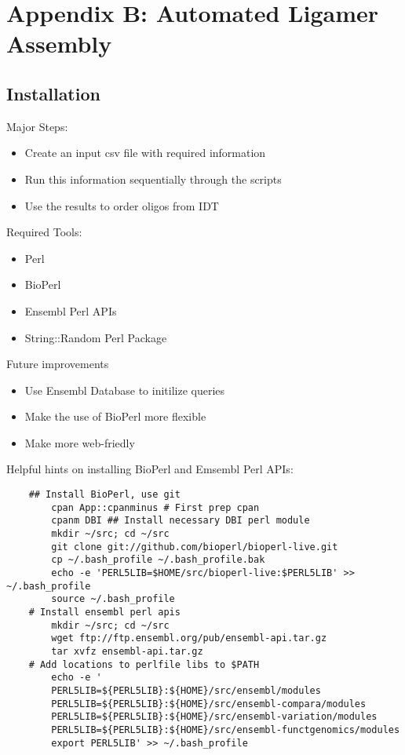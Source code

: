 \chapter{Appendix B: Automated Ligamer Assembly}\label{Appendix:AutoMatedLigamerAssembly} 

\section{Installation}

Major Steps:
\begin{itemize}
	\item  Create an input csv file with required information
	\item  Run this information sequentially through the scripts
	\item  Use the results to order oligos from IDT
\end{itemize}

Required Tools:
\begin{itemize}
	\item  Perl
	\item  BioPerl
	\item  Ensembl Perl APIs
	\item  String::Random Perl Package
\end{itemize}

Future improvements
\begin{itemize}
	\item Use Ensembl Database to initilize queries
	\item Make the use of BioPerl more flexible
	\item Make more web-friedly
\end{itemize}

Helpful hints on installing BioPerl and Emsembl Perl APIs:

\lstset{language=BASH}
\begin{lstlisting}
	## Install BioPerl, use git
	    cpan App::cpanminus # First prep cpan
	    cpanm DBI ## Install necessary DBI perl module
	    mkdir ~/src; cd ~/src
	    git clone git://github.com/bioperl/bioperl-live.git
	    cp ~/.bash_profile ~/.bash_profile.bak
	    echo -e 'PERL5LIB=$HOME/src/bioperl-live:$PERL5LIB' >> ~/.bash_profile
	    source ~/.bash_profile
	# Install ensembl perl apis
	    mkdir ~/src; cd ~/src
	    wget ftp://ftp.ensembl.org/pub/ensembl-api.tar.gz
	    tar xvfz ensembl-api.tar.gz
	# Add locations to perlfile libs to $PATH
	    echo -e '
	    PERL5LIB=${PERL5LIB}:${HOME}/src/ensembl/modules
	    PERL5LIB=${PERL5LIB}:${HOME}/src/ensembl-compara/modules
	    PERL5LIB=${PERL5LIB}:${HOME}/src/ensembl-variation/modules
	    PERL5LIB=${PERL5LIB}:${HOME}/src/ensembl-functgenomics/modules
	    export PERL5LIB' >> ~/.bash_profile
\end{lstlisting}

